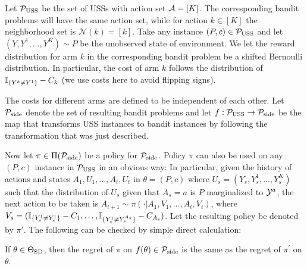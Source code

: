 Let $\mathcal{P}_{\mathrm{USS}}$ be the set of USSs with action set $\mathcal{A} = [K]$.
The corresponding bandit problems will have the same action set,
while for action $k\in [K]$ the neighborhood set is $\mathcal{N}(k) = [k]$.
Take any instance $(P,c)\in \mathcal{P}_{\mathrm{USS}}$ and let $(Y,Y^1,\dots,Y^K) \sim P$ be the 
unobserved state of environment.
We let the reward distribution for arm $k$ in the corresponding bandit problem
be a shifted Bernoulli distribution.
In particular, the cost of arm $k$ follows the distribution of $\mathbb{I}_{\{Y^k\ne Y^1\}} - C_k$ (we use costs here to avoid flipping signs).

The costs for different arms are defined to be independent of each other.
Let $\mathcal{P}_{\mathrm{side}}$ denote the set of resulting bandit problems and let $f:\mathcal{P}_{\mathrm{USS}} \to \mathcal{P}_{\mathrm{side}}$
be the map that transforms USS instances to bandit instances by following the
transformation that was just described.

Now let $\pi\in \Pi(\mathcal{P}_{\mathrm{side}})$ be a policy for $\mathcal{P}_{\mathrm{side}}$.
Policy $\pi$ can also be used on any $(P,c)$ instance in $\mathcal{P}_{\mathrm{USS}}$ in an obvious way:
In particular, given the history of actions and states $A_1,U_1,\dots,A_t,U_t$
in $\theta=(P,c)$ where $U_s = (Y_s,Y_s^1,\dots,Y_s^{K})$ such that 
the distribution of $U_s$ given that $A_s=a$ is $P$ marginalized to $\mathcal{Y}^{a}$,
the next action to be taken is 
$A_{t+1}\sim \pi(\cdot| A_1, V_1,\dots,A_t,V_t)$, where 
$V_s = (\mathbb{I}_{\{Y_s^1\ne Y_s^1\}}-C_1,\dots,\mathbb{I}_{\{Y_s^1\ne Y_s^{A_s}\}}-C_{A_s})$. Let the resulting policy be denoted by $\pi'$.
The following can be checked by simple direct calculation:
\begin{prop} 
	\label{prop:equivalence}
If $\theta \in \Theta_{\mathrm{SD}}$, then the regret of $\pi$ on $f(\theta)\in \mathcal{P}_{\mathrm{side}}$
is the same as the regret of $\pi^\prime$ on $\theta$. 
\end{prop}

